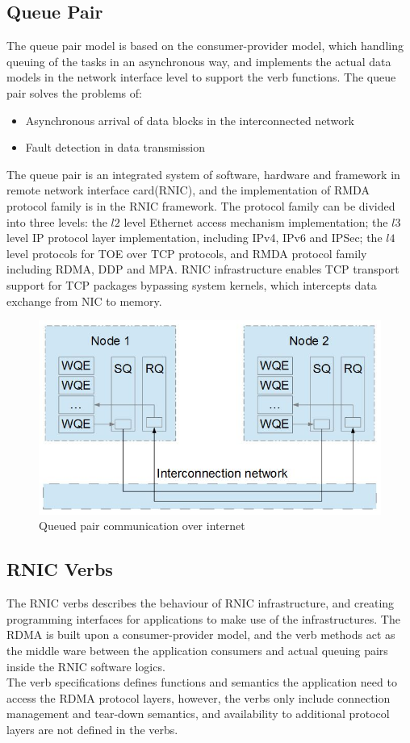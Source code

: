 \documentclass[11pt,openright,a4paper]{report}
\begin{document}
\subsection{Queue Pair}
The queue pair model is based on the consumer-provider model, which handling queuing of the tasks in an asynchronous way, and implements the actual data models in the network interface level to support the verb functions. The queue pair solves the problems of:
\begin{itemize}
\item Asynchronous arrival of data blocks in the interconnected network
\item Fault detection in data transmission
\end{itemize}
The queue pair is an integrated system of software, hardware and framework in remote network interface card(RNIC), and the implementation of RMDA protocol family is in the RNIC framework. The protocol family can be divided into three levels: the \(l2\) level Ethernet access mechanism implementation; the \(l3\) level IP protocol layer implementation, including IPv4, IPv6 and IPSec; the \(l4\) level protocols for TOE over TCP protocols, and RMDA protocol family including RDMA, DDP and MPA\cite{arndt2003infiniband}. RNIC infrastructure enables TCP transport support for TCP packages bypassing system kernels, which intercepts data exchange from NIC to memory. \\ 
\begin{figure}[H]
	\centering
    \includegraphics[width=0.6\linewidth]{picture/queuepair.JPG}
    \caption{Queued pair communication over internet}
    \label{fig:queuedpair}
\end{figure}
\subsection{RNIC Verbs}
The RNIC verbs describes the behaviour of RNIC infrastructure, and creating programming interfaces for applications to make use of the infrastructures\cite{hilland2003rdma}.  The RDMA is built upon a consumer-provider model, and the verb methods act as the middle ware between the application consumers and actual queuing pairs inside the RNIC software logics.\\ 
The verb specifications defines functions and semantics the application need to access the RDMA protocol layers, however, the verbs only include connection management and tear-down semantics, and availability to additional protocol layers  are not defined in the verbs.\\ 
\end{document}
